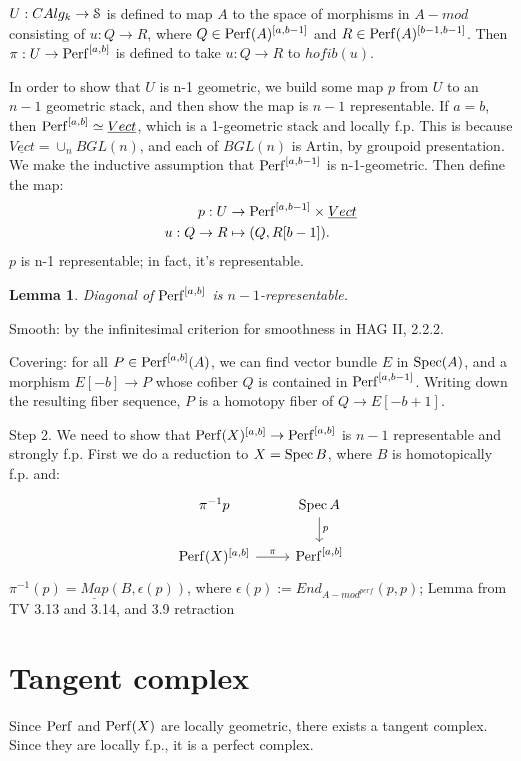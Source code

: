 \documentclass[10pt,a4paper,reqno,oneside]{book} %
\theoremstyle{plain}
\newtheorem{lem}[thm]{Lemma}
\theoremstyle{definition}
\theoremstyle{remark}
\numberwithin{equation}{section}
\begin{document}
$U : CAlg_k \to \mathcal S$ is defined to map $A$ to the space of morphisms in $A-mod$ consisting of $u: Q \to R$, where
$Q \in \mathrm{Perf}(A)^{[a,b-1]}$ and $R \in \mathrm{Perf}(A)^{[b-1,b-1]}$. Then $\pi: U \to \mathrm{Perf}^{[a,b]}$ is defined to take
$u:Q \to R$ to $hofib(u)$.

In order to show that $U$ is n-1 geometric, we build some map $p$ from $U$ to an $n-1$ geometric stack, and then show the map
is $n-1$ representable. If $a = b$, then $\mathrm{Perf}^{[a,b]} \simeq \underline{Vect}$, which is a 1-geometric stack and
locally f.p. This is because $\underline{Vect} = \cup_n B GL(n)$, and each of $B GL(n)$ is Artin, by groupoid presentation.
We make the inductive assumption that $\mathrm{Perf}^{[a,b-1]}$ is n-1-geometric. Then define the map:
\begin{align*}
p : U &\to \mathrm{Perf}^{[a,b-1]} \times \underline{Vect} \\
u:Q \to R &\mapsto (Q, R[b-1]) .
\end{align*}
$p$ is n-1 representable; in fact, it's representable. 

\begin{lem}
Diagonal of $\mathrm{Perf}^{[a,b]}$ is $n-1$-representable.
\end{lem}

Smooth: by the infinitesimal criterion for smoothness in HAG II, 2.2.2.

Covering: for all $P \in \mathrm{Perf}^{[a,b]}(A)$, we can find vector bundle $E$ in $\operatorname{Spec}(A)$, and a morphism $E[-b] \to P$ whose
cofiber $Q$ is contained in $\mathrm{Perf}^{[a,b-1]}$. Writing down the resulting fiber sequence, $P$ is a homotopy fiber
of $Q \to E[-b+1]$. 

Step 2. We need to show that $\mathrm{Perf}(X)^{[a,b]} \to \mathrm{Perf}^{[a,b]}$ is $n-1$ representable and strongly f.p. 
First we do a reduction to $X = \operatorname{Spec} B$, where $B$ is homotopically f.p. and:
\[
\begin{tikzcd}
 \pi^{-1}{p} & \Spec A \arrow{d}{p} \\
\Perf(X)^{[a,b]}\arrow{r}{\pi} & \Perf^{[a,b]}
\end{tikzcd}
\]
$\pi^{-1}(p) = \underline{Map}(B,\epsilon(p))$, where $\epsilon(p) := End_{A-mod^{perf}}(p,p)$;
 Lemma from TV 3.13 and 3.14, and 3.9 retraction

\section{Tangent complex}
Since $\mathrm{Perf}$ and $\mathrm{Perf}(X)$ are locally geometric, there exists a tangent complex. Since they are locally f.p., it is a perfect
complex.
\end{document}
